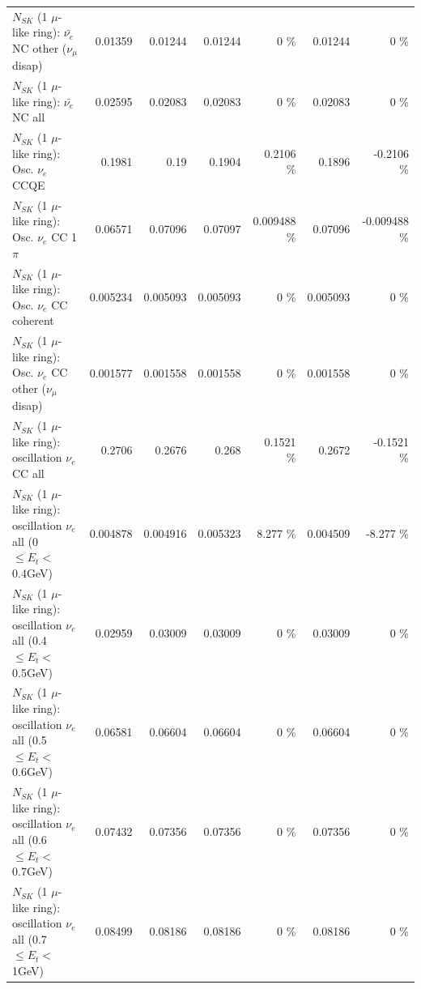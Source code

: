 \begin{table}
\begin{tabular}{| l | r | r | r  r | r  r |}
          $N_{SK}$ (1 $\mu$-like ring): $\bar{\nu_e}$ NC other ($\nu_\mu$ disap) &         0.01359 &         0.01244 &         0.01244 &        0 \%  &         0.01244 &        0 \%  \\ 
                            $N_{SK}$ (1 $\mu$-like ring): $\bar{\nu_{e}}$ NC all &         0.02595 &         0.02083 &         0.02083 &        0 \%  &         0.02083 &        0 \%  \\ 
\hline
\hline
\hline
                                 $N_{SK}$ (1 $\mu$-like ring): Osc. $\nu_e$ CCQE &          0.1981 &            0.19 &          0.1904 &   0.2106 \%  &          0.1896 &  -0.2106 \%  \\ 
                            $N_{SK}$ (1 $\mu$-like ring): Osc. $\nu_e$ CC 1$\pi$ &         0.06571 &         0.07096 &         0.07097 & 0.009488 \%  &         0.07096 & -0.009488 \%  \\ 
                          $N_{SK}$ (1 $\mu$-like ring): Osc. $\nu_e$ CC coherent &        0.005234 &        0.005093 &        0.005093 &        0 \%  &        0.005093 &        0 \%  \\ 
           $N_{SK}$ (1 $\mu$-like ring): Osc. $\nu_e$ CC other ($\nu_\mu$ disap) &        0.001577 &        0.001558 &        0.001558 &        0 \%  &        0.001558 &        0 \%  \\ 
                        $N_{SK}$ (1 $\mu$-like ring): oscillation $\nu_e$ CC all &          0.2706 &          0.2676 &           0.268 &   0.1521 \%  &          0.2672 &  -0.1521 \%  \\ 
\hline
$N_{SK}$ (1 $\mu$-like ring): oscillation $\nu_{e}$ all (0 $\leq E_{t} <$ 0.4GeV) &        0.004878 &        0.004916 &        0.005323 &    8.277 \%  &        0.004509 &   -8.277 \%  \\ 
$N_{SK}$ (1 $\mu$-like ring): oscillation $\nu_{e}$ all (0.4 $\leq E_{t} <$ 0.5GeV) &         0.02959 &         0.03009 &         0.03009 &        0 \%  &         0.03009 &        0 \%  \\ 
$N_{SK}$ (1 $\mu$-like ring): oscillation $\nu_{e}$ all (0.5 $\leq E_{t} <$ 0.6GeV) &         0.06581 &         0.06604 &         0.06604 &        0 \%  &         0.06604 &        0 \%  \\ 
$N_{SK}$ (1 $\mu$-like ring): oscillation $\nu_{e}$ all (0.6 $\leq E_{t} <$ 0.7GeV) &         0.07432 &         0.07356 &         0.07356 &        0 \%  &         0.07356 &        0 \%  \\ 
$N_{SK}$ (1 $\mu$-like ring): oscillation $\nu_{e}$ all (0.7 $\leq E_{t} <$ 1GeV) &         0.08499 &         0.08186 &         0.08186 &        0 \%  &         0.08186 &        0 \%  \\ 

\end{tabular}
\end{table}

